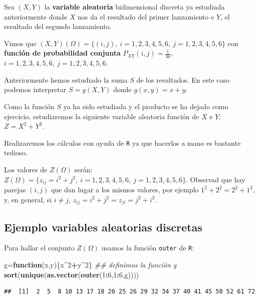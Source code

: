 \documentclass[]{book}
\newenvironment{Shaded}{\begin{snugshade}}{\end{snugshade}}
\newcommand{\CommentTok}[1]{\textcolor[rgb]{0.56,0.35,0.01}{\textit{#1}}}
\newcommand{\ControlFlowTok}[1]{\textcolor[rgb]{0.13,0.29,0.53}{\textbf{#1}}}
\newcommand{\DecValTok}[1]{\textcolor[rgb]{0.00,0.00,0.81}{#1}}
\newcommand{\KeywordTok}[1]{\textcolor[rgb]{0.13,0.29,0.53}{\textbf{#1}}}
\newcommand{\NormalTok}[1]{#1}
\newcommand{\OperatorTok}[1]{\textcolor[rgb]{0.81,0.36,0.00}{\textbf{#1}}}
\begin{document}
Sea \((X,Y)\) la \textbf{variable aleatoria} bidimensional discreta ya estudiada anteriormente donde \(X\) nos da el resultado del primer lanzamiento e \(Y\), el resultado del segundo lanzamiento.

Vimos que \((X,Y)(\Omega)=\{(i,j),\ i=1,2,3,4,5,6,\ j=1,2,3,4,5,6\}\) con \textbf{función de probabilidad conjunta} \(P_{XY}(i,j)=\frac{1}{36}\), \(i=1,2,3,4,5,6,\ j=1,2,3,4,5,6.\)

Anteriormente hemos estudiado la suma \(S\) de los resultados. En este caso podemos interpretar \(S=g(X,Y)\) donde \(g(x,y)=x+y\).

Como la función \(S\) ya ha sido estudiada y el producto se ha dejado como ejercicio, estudiaremos la siguiente variable aleatoria función de \(X\) e \(Y\): \(Z=X^2+Y^2\).

Realizaremos los cálculos con ayuda de \texttt{R} ya que hacerlos a mano es bastante tedioso.

Los valores de \(Z(\Omega)\) serán: \(Z(\Omega)=\{z_{ij}=i^2+j^2,\ i=1,2,3,4,5,6,\ j=1,2,3,4,5,6\}\). Observad que hay parejas \((i,j)\) que dan lugar a los mismos valores, por ejemplo \(1^2+2^2 = 2^2+1^2\), y, en general, si \(i\neq j\), \(z_{ij}=i^2+j^2=z_{ji}=j^2+i^2\).

\hypertarget{ejemplo-variables-aleatorias-discretas-1}{%
\subsection{Ejemplo variables aleatorias discretas}\label{ejemplo-variables-aleatorias-discretas-1}}

Para hallar el conjunto \(Z(\Omega)\) usamos la función \texttt{outer} de \texttt{R}:

\begin{Shaded}
\begin{Highlighting}[]
\NormalTok{g=}\ControlFlowTok{function}\NormalTok{(x,y)\{x}\OperatorTok{^}\DecValTok{2}\OperatorTok{+}\NormalTok{y}\OperatorTok{^}\DecValTok{2}\NormalTok{\}  }\CommentTok{## definimos la función g}
\KeywordTok{sort}\NormalTok{(}\KeywordTok{unique}\NormalTok{(}\KeywordTok{as.vector}\NormalTok{(}\KeywordTok{outer}\NormalTok{(}\DecValTok{1}\OperatorTok{:}\DecValTok{6}\NormalTok{,}\DecValTok{1}\OperatorTok{:}\DecValTok{6}\NormalTok{,g))))}
\end{Highlighting}
\end{Shaded}

\begin{verbatim}
##  [1]  2  5  8 10 13 17 18 20 25 26 29 32 34 37 40 41 45 50 52 61 72
\end{verbatim}
\end{document}
